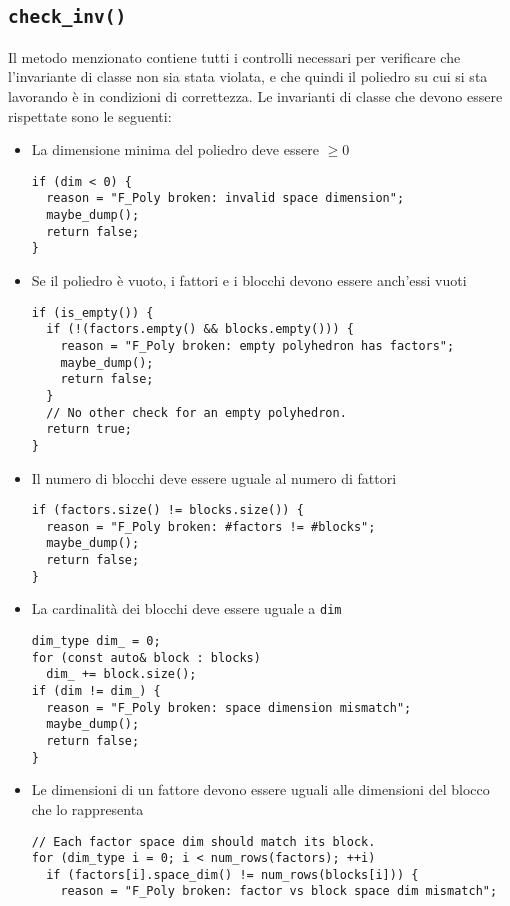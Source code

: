 \documentclass{mimosis}
\theoremstyle{definition}
\begin{document}
\subsection{\texttt{check\_inv()}}
\label{sec:orgbc2d239}
Il metodo menzionato contiene tutti i controlli necessari per verificare che
l'invariante di classe non sia stata violata, e che quindi il poliedro su cui si
sta lavorando è in condizioni di correttezza. Le invarianti di classe che devono
essere rispettate sono le seguenti:

\begin{itemize}
\item La dimensione minima del poliedro deve essere \(\ge 0\)
\begin{verbatim}
if (dim < 0) {
  reason = "F_Poly broken: invalid space dimension";
  maybe_dump();
  return false;
}
\end{verbatim}
\item Se il poliedro è vuoto, i fattori e i blocchi devono essere anch'essi vuoti
\begin{verbatim}
if (is_empty()) {
  if (!(factors.empty() && blocks.empty())) {
    reason = "F_Poly broken: empty polyhedron has factors";
    maybe_dump();
    return false;
  }
  // No other check for an empty polyhedron.
  return true;
}
\end{verbatim}
\item Il numero di blocchi deve essere uguale al numero di fattori
\begin{verbatim}
if (factors.size() != blocks.size()) {
  reason = "F_Poly broken: #factors != #blocks";
  maybe_dump();
  return false;
}
\end{verbatim}
\item La cardinalità dei blocchi deve essere uguale a \texttt{dim}
\begin{verbatim}
dim_type dim_ = 0;
for (const auto& block : blocks)
  dim_ += block.size();
if (dim != dim_) {
  reason = "F_Poly broken: space dimension mismatch";
  maybe_dump();
  return false;
}
\end{verbatim}
\item Le dimensioni di un fattore devono essere uguali alle dimensioni del blocco
che lo rappresenta
\begin{verbatim}
// Each factor space dim should match its block.
for (dim_type i = 0; i < num_rows(factors); ++i)
  if (factors[i].space_dim() != num_rows(blocks[i])) {
    reason = "F_Poly broken: factor vs block space dim mismatch";

\end{verbatim}
\end{itemize}
\end{document}
